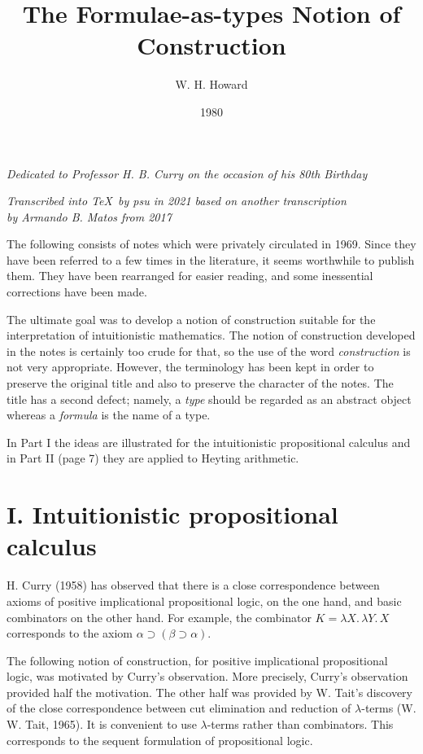 \documentclass[12pt]{article}
\date{}
\title{The Formulae-as-types Notion of Construction}
\author{W. H. Howard}
\date{1980}
\def\l{\lambda}
\def\limp{\supset}
\def\a{\alpha}
\def\b{\beta}
\begin{document}
\maketitle
\begin{center}
{\small\it Dedicated to Professor H. B. Curry on the occasion of his 80th Birthday}
\end{center}
\begin{center}
{\small\it Transcribed into \TeX\ by psu in 2021 based on another transcription \\ by Armando B. Matos from 2017}
\end{center}
\bigskip

\medskip
\noindent
The following consists of notes which were privately circulated in 1969. Since they have been referred to a few times in the literature, it seems worthwhile to publish them. They have been rearranged for easier reading, and some inessential corrections have been made.

The ultimate goal was to develop a notion of construction suitable for the interpretation of intuitionistic mathematics. The notion of construction developed in the notes is certainly too crude for that, so the use of the word {\it construction} is not very appropriate. However, the terminology has been kept in order to preserve the original title and also to preserve the character of the notes. The title has a second defect; namely, a {\it type} should be regarded as an abstract object whereas a {\it formula} is the name of a type.

In Part I the ideas are illustrated for the intuitionistic propositional calculus and in Part II (page 7) they are applied to Heyting arithmetic.

\section{I. Intuitionistic propositional calculus}

H. Curry (1958) has observed that there is a close correspondence between axioms of positive implicational propositional logic, on the one hand, and basic combinators on the other hand. For example, the combinator $K = \l X.\,\l Y.\,X$ corresponds to the axiom $\a \limp (\b \limp \a)$.

The following notion of construction, for positive implicational propositional logic, was motivated by Curry's observation. More precisely, Curry's observation provided half the motivation. The other half was provided by W. Tait's discovery of the close correspondence between cut elimination and reduction of $\l$-terms (W. W. Tait, 1965). It is convenient to use $\l$-terms rather than combinators. This corresponds to the sequent formulation of propositional logic.
\end{document}
